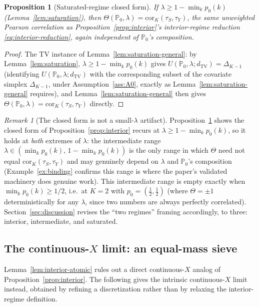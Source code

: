 \documentclass[11pt]{article}
\theoremstyle{plain}
\newtheorem{proposition}[theorem]{Proposition}
\theoremstyle{definition}
\theoremstyle{remark}
\newtheorem{remark}[theorem]{Remark}
\newcommand{\PP}{\mathbb{P}}
\newcommand{\Corr}{\mathrm{cor}}
\begin{document}
\begin{proposition}[Saturated-regime closed form]\label{prop:saturated}
If $\lambda\ge1-\min_kp_0(k)$ (Lemma~\ref{lem:saturation}), then
$\Theta(\PP_0,\lambda)=\Corr_K(\tau_S,\tau_Y)$, the same unweighted Pearson
correlation as Proposition~\ref{prop:interior}'s interior-regime reduction
\eqref{eq:interior-reduction}, again independent of $\PP_0$'s composition.
\end{proposition}

\begin{proof}
The TV instance of Lemma~\ref{lem:saturation-general}: by Lemma~\ref{lem:saturation},
$\lambda\ge1-\min_kp_0(k)$ gives $U(\PP_0,\lambda;d_{\mathrm{TV}})=\Delta_{K-1}$
(identifying $U(\PP_0,\lambda;d_{\mathrm{TV}})$ with the corresponding subset of the
covariate simplex $\Delta_{K-1}$, under Assumption~\ref{ass:A0}, exactly as
Lemma~\ref{lem:saturation-general} requires), and Lemma~\ref{lem:saturation-general}
then gives $\Theta(\PP_0,\lambda)=\Corr_K(\tau_S,\tau_Y)$ directly.
\end{proof}

\begin{remark}[The closed form is not a small-$\lambda$ artifact]\label{rem:saturated-scope}
Proposition~\ref{prop:saturated} shows the closed form of
Proposition~\ref{prop:interior} recurs at $\lambda\ge1-\min_kp_0(k)$, so it holds at
\emph{both} extremes of $\lambda$: the intermediate range
$\lambda\in(\min_kp_0(k),\,1-\min_kp_0(k))$ is the only range in which $\Theta$ need
not equal $\Corr_K(\tau_S,\tau_Y)$ and may genuinely depend on $\lambda$ and
$\PP_0$'s composition (Example~\ref{ex:binding} confirms this range is where the
paper's validated machinery does genuine work). This intermediate range is empty
exactly when $\min_kp_0(k)\ge1/2$, i.e.\ at $K=2$ with $p_0=(\tfrac12,\tfrac12)$
(where $\Theta=\pm1$ deterministically for any $\lambda$, since two numbers are
always perfectly correlated). Section~\ref{sec:discussion} revises the ``two
regimes'' framing accordingly, to three: interior, intermediate, and saturated.
\end{remark}

\subsection{The continuous-$X$ limit: an equal-mass sieve}\label{sec:sieve-limit}

Lemma~\ref{lem:interior-atomic} rules out a direct continuous-$X$ analog of
Proposition~\ref{prop:interior}. The following gives the intrinsic continuous-$X$
limit instead, obtained by refining a discretization rather than by relaxing the
interior-regime definition.
\end{document}
